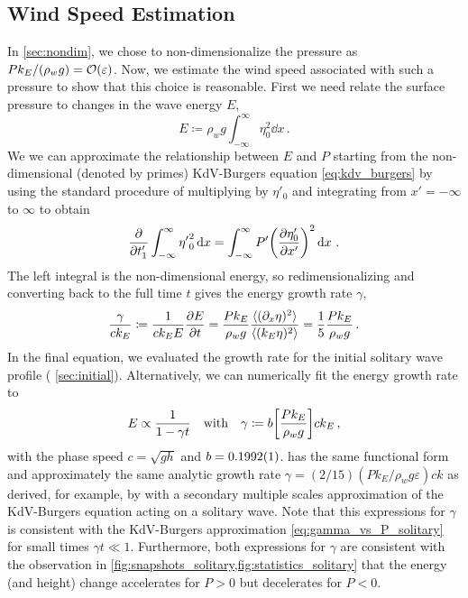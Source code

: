 \documentclass{jfm}
\renewcommand*{\epsilon}{\varepsilon}
\begin{document}
\subsection{\label{sec:press_mag} Wind Speed Estimation}
In \cref{sec:nondim}, we chose to non-dimensionalize the pressure as $P
k_E/(\rho_w g) = \order{\epsilon}$.
Now, we estimate the wind speed associated with such a pressure
to show that this choice is reasonable.
First we need relate the surface pressure to changes in the wave energy $E$,
\begin{equation}
  E \coloneqq \rho_w g \int_{-\infty}^{\infty} {\eta}_0^2 \dd{x} \,.
\end{equation}
We we can approximate the relationship between $E$ and $P$ starting from
the non-dimensional (denoted by primes) KdV-Burgers equation
\cref{eq:kdv_burgers} by using the standard procedure
\citep[\eg][]{mei2005nonlinear} of multiplying by $\eta'_0$ and
integrating from $x'=-\infty$ to $\infty$ to obtain
\begin{equation}
  \pdv{t'_1} \int_{-\infty}^{\infty} {\eta'}_0^2 \dd{x}
  = \int_{-\infty}^{\infty} P' \pqty{\pdv{\eta'_0}{x'}}^2
  \dd{x} \,.
\end{equation}
The left integral is the non-dimensional energy, so redimensionalizing
and converting back to the full time $t$ gives the energy growth rate
$\gamma$,
\begin{equation}
  \frac{\gamma}{c k_E} \coloneqq
  \frac{1}{c k_E E} \pdv{E}{t}
  = \frac{P k_E}{\rho_w g} \frac{\langle (\partial_x \eta)^2 \rangle}
    {\langle (k_E \eta)^2 \rangle}
  = \frac{1}{5} \frac{P k_E}{\rho_w g}
  \,.
  \label{eq:gamma_vs_P_solitary}
\end{equation}
In the final equation, we evaluated the growth rate for the initial
solitary wave profile (\cf{} \cref{sec:initial}).
Alternatively, we can numerically fit the energy growth rate to
\begin{equation}
  E \propto \frac{1}{1 - \gamma t}
  \qq{with}
  \gamma \coloneqq b \bqty{\frac{P k_E}{\rho_w g}} c k_E
  \,,
  \label{eq:actual_energy}
\end{equation}
with the phase speed $c = \sqrt{gh}$ and $b = \num{0.1992 \pm 0.0001}$.
 has the same functional form and approximately
the same analytic growth rate $\gamma = (2/15) (P k_E/\rho_w g
\epsilon) ck$ as derived, for example, by \citet{zdyrski2019effects}
with a secondary multiple scales approximation of the KdV-Burgers
equation acting on a solitary wave.
Note that this expressions for $\gamma$ is consistent with the
KdV-Burgers approximation \cref{eq:gamma_vs_P_solitary} for small times
$\gamma t \ll 1$.
Furthermore, both expressions for $\gamma$ are consistent with the
observation in \cref{fig:snapshots_solitary,fig:statistics_solitary}
that the energy (and height) change accelerates for $P>0$ but
decelerates for $P<0$.
\end{document}
